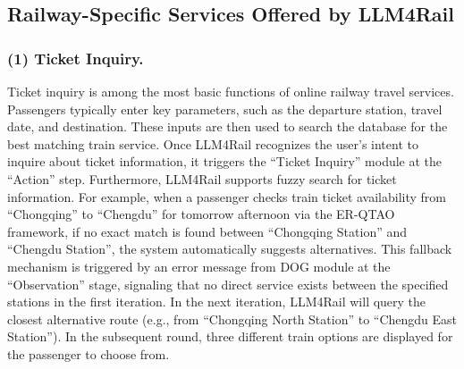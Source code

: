 \documentclass[runningheads]{llncs}
\begin{document}




\subsection{Railway-Specific Services Offered by LLM4Rail}

\subsubsection{(1) Ticket Inquiry.} 

Ticket inquiry is among the most basic functions of online railway travel services. 
Passengers typically enter key parameters, such as the departure station, travel date, and destination. 
These inputs are then used to search the database for the best matching train service.
Once LLM4Rail recognizes the user's intent to inquire about ticket information, it triggers the ``Ticket Inquiry'' module at the ``Action'' step.
Furthermore, LLM4Rail supports fuzzy search for ticket information.
For example, when a passenger checks train ticket availability from ``Chongqing'' to ``Chengdu'' for tomorrow afternoon via the ER-QTAO framework, if no exact match is found between ``Chongqing Station'' and ``Chengdu Station'', the system automatically suggests alternatives.
This fallback mechanism is triggered by an error message from DOG module at the ``Observation'' stage, signaling that no direct service exists between the specified stations in the first iteration.
In the next iteration, LLM4Rail will query the closest alternative route (e.g., from ``Chongqing North Station'' to ``Chengdu East Station''). 
In the subsequent round, three different train options are displayed for the passenger to choose from.
\end{document}
